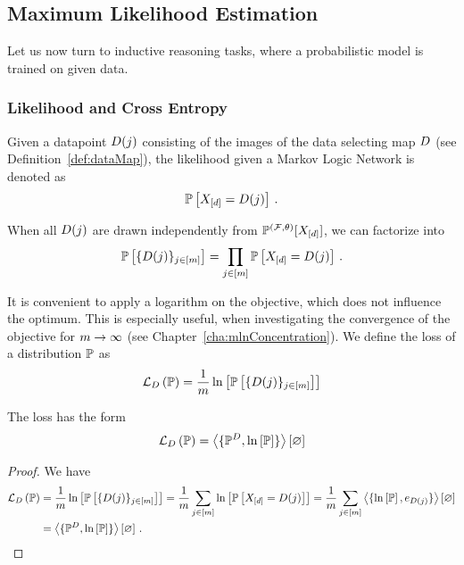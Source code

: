 \subsection{Maximum Likelihood Estimation} %

Let us now turn to inductive reasoning tasks, where a probabilistic model is trained on given data.

\subsubsection{Likelihood and Cross Entropy}

Given a datapoint $D(j)$ consisting of the images of the data selecting map $D$ (see Definition~\ref{def:dataMap}), the likelihood given a Markov Logic Network is denoted as
	\[ \mathbb{P}\left[X_{[d]} = D(j)\right] \, . \]
	
When all $D(j)$ are drawn independently from $\mathbb{P}^{(\mathcal{F},\theta)}[X_{[d]}]$, we can factorize into
	\[ \mathbb{P}\left[\{D(j)\}_{j\in[m]}\right]  = \prod_{j\in[m]} \mathbb{P}\left[X_{[d]}=D(j)\right] \, . \]

It is convenient to apply a logarithm on the objective, which does not influence the optimum.
This is especially useful, when investigating the convergence of the objective for $m\rightarrow\infty$ (see Chapter~\ref{cha:mlnConcentration}).
We define the loss of a distribution $\mathbb{P}$ as
\begin{align}\label{eq:defLikelihoodLossPL}
	\mathcal{L}_{D}\left(\mathbb{P}\right) 
	= \frac{1}{m} \ln \left[ \mathbb{P}\left[\{D(j)\}_{j\in[m]}\right] \right] 
\end{align}

\begin{lemma}
	The loss has the form 
	\begin{align}
		\mathcal{L}_{D}\left(\mathbb{P}\right) = \left\langle \{\mathbb{P}^{D},\ln \left[ \mathbb{P} \right]\}\right\rangle \left[ \varnothing \right]
	\end{align}
\end{lemma}
\begin{proof}
	We have
	\begin{align*}
		\lossof{\probtensor} 
		& = \frac{1}{\datanum} \lnof{\probof{\data}} 
		= \frac{1}{\datanum} \sum_{\datain} \lnof{\probof{\shortcatvariables =\datamap(\dataindex)}} 
		= \frac{1}{\datanum} \sum_{\datain} \contractionof{\{\lnof{\probtensor},\onehotmapof{\datamap(\dataindex)}\}}{\varnothing} \\ 
		& = \contractionof{\{\empdistribution,\lnof{\probtensor}\}}{\varnothing} \, .
	\end{align*}
\end{proof}

